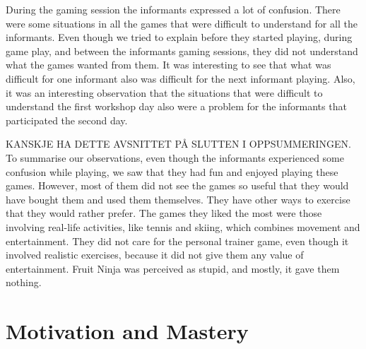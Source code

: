 During the gaming session the informants expressed a lot of confusion. There were some situations in all the games that were difficult to understand for all the informants. Even though we tried to explain before they started playing, during game play, and between the informants gaming sessions, they did not understand what the games wanted from them. It was interesting to see that what was difficult for one informant also was difficult for the next informant playing. Also, it was an interesting observation that the situations that were difficult to understand the first workshop day also were a problem for the informants that participated the second day. 

KANSKJE HA DETTE AVSNITTET PÅ SLUTTEN I OPPSUMMERINGEN. 
To summarise our observations, even though the informants experienced some confusion while playing, we saw that they had fun and enjoyed playing these games. However, most of them did not see the games so useful that they would have bought them and used them themselves. They have other ways to exercise that they would rather prefer. The games they liked the most were those involving real-life activities, like tennis and skiing, which combines movement and entertainment. They did not care for the personal trainer game, even though it involved realistic exercises, because it did not give them any value of entertainment. Fruit Ninja was perceived as stupid, and mostly, it gave them nothing.   

\section{Motivation and Mastery}


